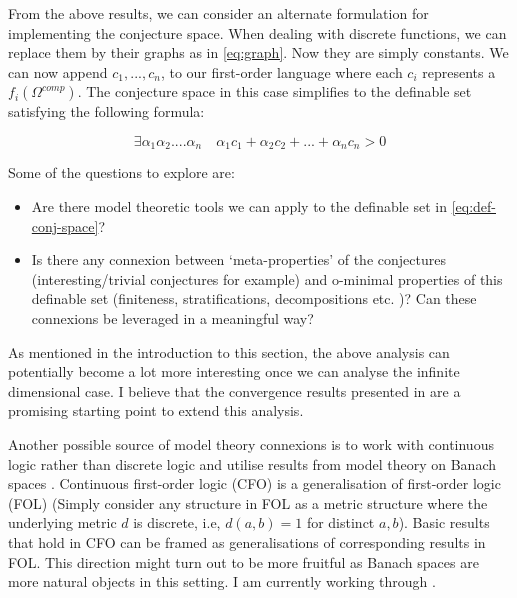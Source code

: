 From the above results, we can consider an alternate formulation for implementing the conjecture space. When dealing with discrete functions, we can replace them by their graphs as in \ref{eq:graph}. Now they are simply constants. We can now append $c_1,...,c_n$, to our first-order language where each $c_i$ represents a $f_i(\Omega^{comp})$. The conjecture space in this case simplifies to the definable set satisfying the following formula:

\begin{equation}
    \label{eq:def-conj-space}
    \exists\alpha_1\alpha_2....\alpha_n\quad\alpha_1c_1+\alpha_2c_2+...+\alpha_nc_n > 0
\end{equation}

Some of the questions to explore are: 
\begin{itemize}
    \item Are there model theoretic tools we can apply to the definable set in \ref{eq:def-conj-space}?
    \item Is there any connexion between `meta-properties' of the conjectures (interesting/trivial conjectures for example) and o-minimal properties of this definable set (finiteness, stratifications, decompositions etc. \cite{Dries_1998})? Can these connexions be leveraged in a meaningful way?
\end{itemize}

As mentioned in the introduction to this section, the above analysis can potentially become a lot more interesting once we can analyse the infinite dimensional case. I believe that the convergence results presented in \cite{thomasConvergenceResultsFunction2012} are a promising starting point to extend this analysis.
\begin{remark}
    Another possible source of model theory connexions is to work with continuous logic rather than discrete logic and utilise results from model theory on Banach spaces \cite{yaacovModelTheoryMetric2008}. Continuous first-order logic (CFO) is a generalisation of first-order logic (FOL) (Simply consider any structure in FOL as a metric structure where the underlying metric $d$ is discrete, i.e, $d(a, b) = 1$ for distinct $a, b$). Basic results that hold in CFO can be framed as generalisations of corresponding results in FOL. 
    This direction might turn out to be more fruitful as Banach spaces are more natural objects in this setting. I am currently working through \cite{yaacovModelTheoryMetric2008}.   
\end{remark}

